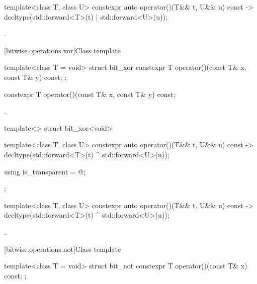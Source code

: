 %
\begin{itemdecl}
template<class T, class U> constexpr auto operator()(T&& t, U&& u) const
    -> decltype(std::forward<T>(t) | std::forward<U>(u));
\end{itemdecl}

\begin{itemdescr}
\pnum
\returns
{}.
\end{itemdescr}

[bitwise.operations.xor]{Class template }

%
\begin{itemdecl}
template<class T = void> struct bit_xor {
  constexpr T operator()(const T& x, const T& y) const;
};
\end{itemdecl}

%
\begin{itemdecl}
constexpr T operator()(const T& x, const T& y) const;
\end{itemdecl}

\begin{itemdescr}
\pnum
\returns
{}.
\end{itemdescr}

%
\begin{itemdecl}
template<> struct bit_xor<void> {
  template<class T, class U> constexpr auto operator()(T&& t, U&& u) const
    -> decltype(std::forward<T>(t) ^ std::forward<U>(u));

  using is_transparent = @\unspec@;
};
\end{itemdecl}

%
\begin{itemdecl}
template<class T, class U> constexpr auto operator()(T&& t, U&& u) const
    -> decltype(std::forward<T>(t) ^ std::forward<U>(u));
\end{itemdecl}

\begin{itemdescr}
\pnum
\returns
{}.
\end{itemdescr}

[bitwise.operations.not]{Class template }

\begin{itemdecl}
template<class T = void> struct bit_not {
  constexpr T operator()(const T& x) const;
};
\end{itemdecl}

